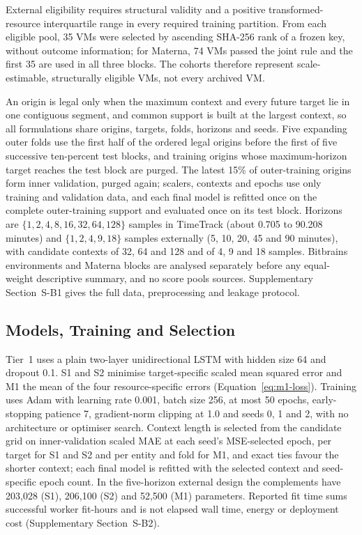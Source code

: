 External eligibility requires structural validity and a positive
transformed-resource interquartile range in every required training
partition. From each eligible pool, 35 VMs were selected by ascending SHA-256
rank of a frozen key, without outcome information; for Materna, 74 VMs passed
the joint rule and the first 35 are used in all three blocks. The cohorts
therefore represent scale-estimable, structurally eligible VMs, not every
archived VM.

An origin is legal only when the maximum context and every future target lie
in one contiguous segment, and common support is built at the largest
context, so all formulations share origins, targets, folds, horizons and
seeds. Five expanding outer folds use the first half of the ordered legal
origins before the first of five successive ten-percent test blocks, and
training origins whose maximum-horizon target reaches the test block are
purged. The latest 15\% of outer-training origins form inner validation,
purged again; scalers, contexts and epochs use only training and validation
data, and each final model is refitted once on the complete outer-training
support and evaluated once on its test block. Horizons are
$\{1,2,4,8,16,32,64,128\}$ samples in TimeTrack (about 0.705 to 90.208
minutes) and $\{1,2,4,9,18\}$ samples externally (5, 10, 20, 45 and 90
minutes), with candidate contexts of 32, 64 and 128 and of 4, 9 and 18
samples. Bitbrains environments and Materna blocks are analysed separately
before any equal-weight descriptive summary, and no score pools sources.
Supplementary Section~S-B1 gives the full data, preprocessing and leakage
protocol.


\subsection{Models, Training and Selection}
\label{sec:architecture-training}
\label{sec:model-selection}

Tier~1 uses a plain two-layer unidirectional LSTM \citep{Hochreiter1997LSTM}
with hidden size 64 and dropout 0.1. S1 and S2 minimise target-specific scaled
mean squared error and M1 the mean of the four resource-specific errors
(Equation~\ref{eq:m1-loss}). Training uses Adam with learning rate 0.001,
batch size 256, at most 50 epochs, early-stopping patience 7, gradient-norm
clipping at 1.0 and seeds 0, 1 and 2, with no architecture or optimiser
search. Context length is selected from the candidate grid on
inner-validation scaled MAE at each seed's MSE-selected epoch, per target for
S1 and S2 and per entity and fold for M1, and exact ties favour the shorter
context; each final model is refitted with the selected context and
seed-specific epoch count. In the five-horizon external design the
complements have 203,028 (S1), 206,100 (S2) and 52,500 (M1) parameters.
Reported fit time sums successful worker fit-hours and is not elapsed wall
time, energy or deployment cost (Supplementary Section~S-B2).

